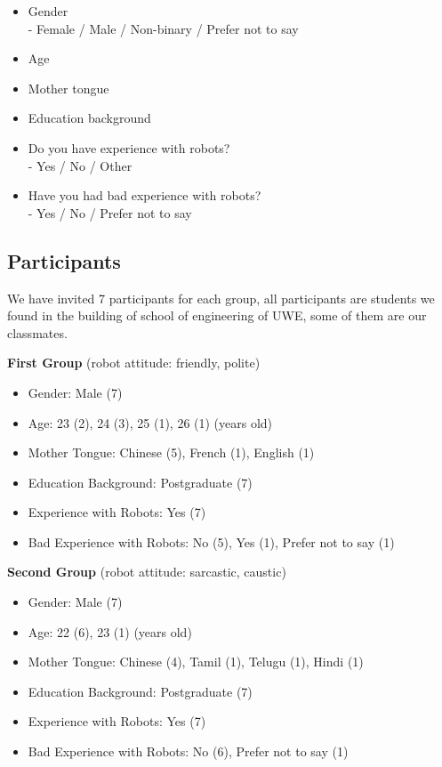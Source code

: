 \documentclass[conference]{IEEEtran}
\begin{document}
\begin{itemize}
    \item Gender
    \\ - Female / Male / Non-binary / Prefer not to say
    \item Age
    \item Mother tongue
    \item Education background
    \item Do you have experience with robots?
    \\ - Yes / No / Other
    \item Have you had bad experience with robots?
    \\ - Yes / No / Prefer not to say
    
\end{itemize}

\subsection{Participants}
\label{section:Participants}


We have invited 7 participants for each group, all participants are students we found in the building of school of engineering of UWE, some of them are our classmates.


\textbf{First Group} (robot attitude: friendly, polite)
\begin{itemize}
    \item Gender: Male (7)
    \item Age: 23 (2), 24 (3), 25 (1), 26 (1) (years old)
    \item Mother Tongue: Chinese (5), French (1), English (1)
    \item Education Background: Postgraduate (7)
    \item Experience with Robots: Yes (7)
    \item Bad Experience with Robots: No (5), Yes (1), Prefer not to say (1)
\end{itemize}

\textbf{Second Group} (robot attitude: sarcastic, caustic)
\begin{itemize}
    \item Gender: Male (7)
    \item Age: 22 (6), 23 (1) (years old)
    \item Mother Tongue: Chinese (4), Tamil (1), Telugu (1), Hindi (1)
    \item Education Background: Postgraduate (7)
    \item Experience with Robots: Yes (7)
    \item Bad Experience with Robots: No (6), Prefer not to say (1)
\end{itemize}
\end{document}
